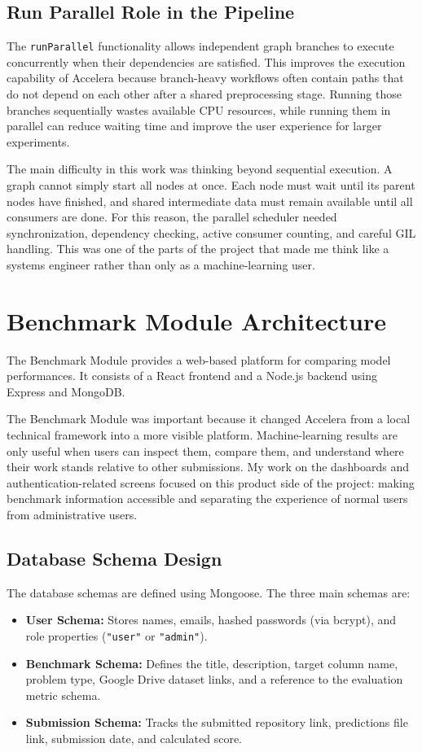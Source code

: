 \documentclass[12pt,a4paper,oneside]{report}
\newcommand{\systemname}{Accelera}
\newcommand{\modulepath}[1]{\texttt{#1}}
\begin{document}
\subsection{Run Parallel Role in the Pipeline}
\noindent The \modulepath{runParallel} functionality allows independent graph branches to execute concurrently when their dependencies are satisfied. This improves the execution capability of \systemname{} because branch-heavy workflows often contain paths that do not depend on each other after a shared preprocessing stage. Running those branches sequentially wastes available CPU resources, while running them in parallel can reduce waiting time and improve the user experience for larger experiments.

The main difficulty in this work was thinking beyond sequential execution. A graph cannot simply start all nodes at once. Each node must wait until its parent nodes have finished, and shared intermediate data must remain available until all consumers are done. For this reason, the parallel scheduler needed synchronization, dependency checking, active consumer counting, and careful GIL handling. This was one of the parts of the project that made me think like a systems engineer rather than only as a machine-learning user.

\section{Benchmark Module Architecture}
The Benchmark Module provides a web-based platform for comparing model performances. It consists of a React frontend and a Node.js backend using Express and MongoDB.

The Benchmark Module was important because it changed \systemname{} from a local technical framework into a more visible platform. Machine-learning results are only useful when users can inspect them, compare them, and understand where their work stands relative to other submissions. My work on the dashboards and authentication-related screens focused on this product side of the project: making benchmark information accessible and separating the experience of normal users from administrative users.

\subsection{Database Schema Design}
The database schemas are defined using Mongoose. The three main schemas are:
\begin{itemize}[leftmargin=*]
    \item \textbf{User Schema:} Stores names, emails, hashed passwords (via bcrypt), and role properties (\texttt{"user"} or \texttt{"admin"}).
    \item \textbf{Benchmark Schema:} Defines the title, description, target column name, problem type, Google Drive dataset links, and a reference to the evaluation metric schema.
    \item \textbf{Submission Schema:} Tracks the submitted repository link, predictions file link, submission date, and calculated score.
\end{itemize}
\end{document}

